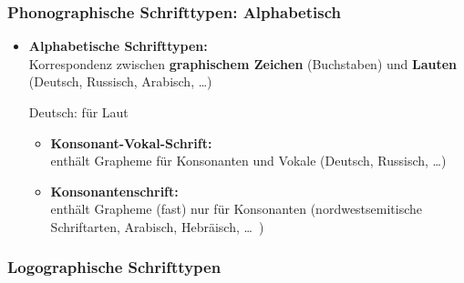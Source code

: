 \begin{frame}
\frametitle{Phonographische Schrifttypen: Alphabetisch}


\begin{itemize}

	\item \textbf{Alphabetische Schrifttypen:} \\
Korrespondenz zwischen \textbf{graphischem Zeichen} (Buchstaben) und \textbf{Lauten}  (Deutsch, Russisch, Arabisch, \dots)
	
	\ea Deutsch:  für Laut \textipa{[t]}
	\z 
	
	\pause 
	
	\begin{itemize}
		\item \textbf{Konsonant-Vokal-Schrift:} \\
		enthält Grapheme für Konsonanten und Vokale (\zB Deutsch, Russisch, \ldots)
		
		\item \textbf{Konsonantenschrift:}\\
		enthält Grapheme (fast) nur für Konsonanten (\zB nordwestsemitische Schriftarten, Arabisch, Hebräisch, \ldots\ \citep[vgl.][358]{Glueck16b}) 
	\end{itemize}
	
	\end{itemize}

\end{frame}


\subsubsection{Logographische Schrifttypen}

